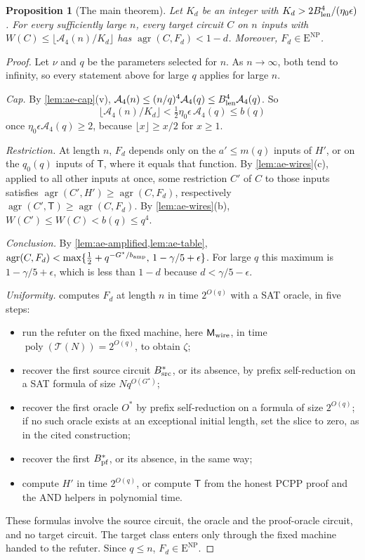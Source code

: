 \documentclass[11pt,letterpaper]{article}
\newtheorem{proposition}[theorem]{Proposition}
\theoremstyle{definition}
\theoremstyle{remark}
\newcommand{\ENP}{\mathrm{E}^{\mathrm{NP}}}
\newcommand{\poly}{\operatorname{poly}}
\newcommand{\agr}{\operatorname{agr}}
\newcommand{\Tclk}{\mathcal T}
\begin{document}
\begin{proposition}[The main theorem]\label{prop:ae-final}
Let \(K_d\) be an integer with \(K_d>2B_{\rm len}^4/(\eta_0\epsilon)\).
For every sufficiently large \(n\), every target circuit \(C\) on
\(n\) inputs with \(W(C)\le\lfloor\mathcal A_4(n)/K_d\rfloor\) has
\(\agr(C,F_d)<1-d\). Moreover, \(F_d\in\ENP\).
\end{proposition}
\begin{proof}
Let \(\nu\) and \(q\) be the parameters selected for \(n\). As
\(n\to\infty\), both tend to infinity, so every statement above for
large \(q\) applies for large \(n\).

\emph{Cap.} By \cref{lem:ae-cap}(v),
\(\mathcal A_4(n)\le(n/q)^4\mathcal A_4(q)\le B_{\rm len}^4\mathcal A_4(q)\).
So
\[
 \lfloor\mathcal A_4(n)/K_d\rfloor
 <\tfrac12\eta_0\epsilon\,\mathcal A_4(q)\le b(q)
\]
once \(\eta_0\epsilon\mathcal A_4(q)\ge2\), because \(\lfloor x\rfloor\ge x/2\)
for \(x\ge1\).

\emph{Restriction.} At length \(n\), \(F_d\) depends only on the
\(a'\le m(q)\) inputs of \(H'\), or on the \(q_0(q)\) inputs of
\(\mathsf T\), where it equals that function. By
\cref{lem:ae-wires}(c), applied to all other inputs at once, some
restriction \(C'\) of \(C\) to those inputs satisfies
\(\agr(C',H')\ge\agr(C,F_d)\), respectively
\(\agr(C',\mathsf T)\ge\agr(C,F_d)\). By \cref{lem:ae-wires}(b),
\(W(C')\le W(C)<b(q)\le q^4\).

\emph{Conclusion.} By \cref{lem:ae-amplified,lem:ae-table},
\(\agr(C,F_d)<\max\{\frac12+q^{-G^\star/b_{\rm amp}},\,1-\gamma/5+\epsilon\}\).
For large \(q\) this maximum is \(1-\gamma/5+\epsilon\), which is less
than \(1-d\) because \(d<\gamma/5-\epsilon\).

\emph{Uniformity.} \cite[Section~11.6, final paragraph]{NagCG} computes
\(F_d\) at length \(n\) in time \(2^{O(q)}\) with a SAT oracle, in five
steps:
\begin{itemize}
\item run the refuter on the fixed machine, here
\(\mathsf M_{\rm wire}\), in time \(\poly(\Tclk(N))=2^{O(q)}\), to
obtain \(\zeta\);
\item recover the first source circuit \(B^*_{\rm src}\), or its
absence, by prefix self-reduction on a SAT formula of size
\(Nq^{O(G^\star)}\);
\item recover the first oracle \(O^*\) by prefix self-reduction on a
formula of size \(2^{O(q)}\); if no such oracle exists at an exceptional
initial length, set the slice to zero, as in the cited construction;
\item recover the first \(B^*_{\rm pf}\), or its absence, in the same
way;
\item compute \(H'\) in time \(2^{O(q)}\), or compute \(\mathsf T\)
from the honest PCPP proof and the AND helpers in polynomial time.
\end{itemize}
These formulas involve the source circuit, the oracle and the
proof-oracle circuit, and no target circuit. The target class enters
only through the fixed machine handed to the refuter. Since
\(q\le n\), \(F_d\in\ENP\).
\end{proof}
\end{document}
